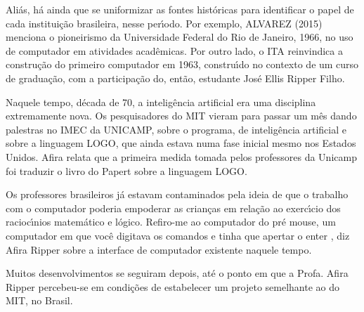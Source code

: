 \documentclass[
12pt,		%
openright,	%
twoside,  %
a4paper,			%
chapter=TITLE,		%
english,			%
french,				%
spanish,			%
brazil				%
]{USPSC-classe/USPSC}
\begin{document}
Ali\'as, h\'a ainda que se uniformizar as fontes hist\'oricas para identificar o papel de cada institui\c{c}\~ao brasileira, nesse per\'{\i}odo. Por exemplo,  ALVAREZ (2015) menciona o pioneirismo da Universidade Federal do Rio de Janeiro, 1966, no uso de computador em atividades acad\^emicas. Por outro lado, o ITA reinvindica a constru\c{c}\~ao do primeiro computador em 1963, constru\'{\i}do no contexto de um curso de gradua\c{c}\~ao, com a participa\c{c}\~ao do, ent\~ao, estudante Jos\'e Ellis Ripper Filho.

















Naquele tempo, d\'ecada de 70, a intelig\^encia artificial era uma disciplina extremamente nova. Os pesquisadores do MIT vieram para passar um m\^es dando palestras no IMEC da UNICAMP, sobre o programa, de intelig\^encia artificial e sobre a linguagem LOGO, que ainda estava numa fase inicial mesmo nos Estados Unidos. Afira relata que a primeira medida tomada pelos professores da Unicamp foi traduzir o livro do Papert sobre a linguagem LOGO.

















Os professores brasileiros j\'a estavam contaminados pela ideia de que o trabalho com o computador poderia empoderar as crian\c{c}as em rela\c{c}\~ao ao exerc\'{\i}cio dos racioc\'{\i}nios matem\'atico e l\'ogico. \textquotedbl Refiro-me ao computador do pr\'e mouse, um computador em que voc\^e digitava os comandos e tinha que apertar o enter \textquotedbl , diz Afira Ripper sobre a interface de computador existente naquele tempo.

















Muitos desenvolvimentos se seguiram depois, at\'e o ponto em que a Profa. Afira Ripper percebeu-se em condi\c{c}\~oes de estabelecer um projeto semelhante ao do MIT, no Brasil.
\end{document}
